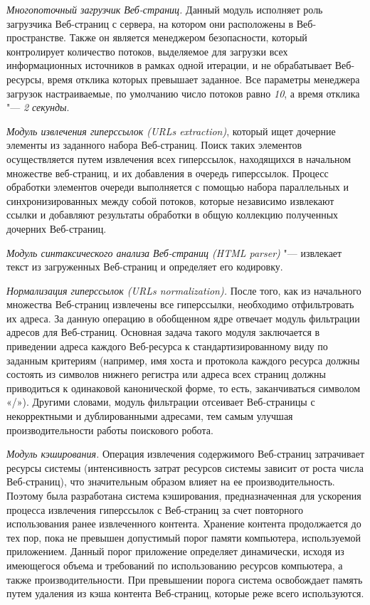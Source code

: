 \textit{Многопоточный загрузчик Веб-страниц.} Данный модуль исполняет роль загрузчика Веб-страниц с сервера, на котором они расположены в Веб-пространстве. Также он является менеджером безопасности, который контролирует количество потоков, выделяемое для загрузки всех информационных источников в рамках одной итерации, и не обрабатывает Веб-ресурсы, время отклика которых превышает заданное. Все параметры менеджера загрузок настраиваемые, по умолчанию число потоков равно \textit{10}, а время отклика "--- \textit{2 секунды}.

\textit{Модуль извлечения гиперссылок (URLs extraction)}, который ищет дочерние элементы из заданного набора Веб-страниц. Поиск таких элементов осуществляется путем извлечения всех гиперссылок, находящихся в начальном множестве веб-страниц, и их добавления в очередь гиперссылок. Процесс обработки элементов очереди выполняется с помощью набора параллельных и синхронизированных между собой потоков, которые независимо извлекают ссылки и добавляют результаты обработки в общую коллекцию полученных дочерних Веб-страниц.

\textit{Модуль синтаксического анализа Веб-страниц (HTML parser)} "--- извлекает текст из загруженных Веб-страниц и определяет его кодировку.

\textit{Нормализация гиперссылок (URLs normalization).} После того, как из начального множества Веб-страниц извлечены все гиперссылки, необходимо отфильтровать их адреса. За данную операцию в обобщенном ядре отвечает модуль фильтрации адресов для Веб-страниц. Основная задача такого модуля заключается в приведении адреса каждого Веб-ресурса к стандартизированному виду по заданным критериям \cite{LeeKimHong} (например, имя хоста и протокола каждого ресурса должны состоять из символов нижнего регистра или адреса всех страниц должны приводиться к одинаковой канонической форме, то есть, заканчиваться символом «/»). Другими словами, модуль фильтрации отсеивает Веб-страницы с некорректными и дублированными адресами, тем самым улучшая производительности работы поискового робота.

\textit{Модуль кэширования.} Операция извлечения содержимого Веб-страниц затрачивает ресурсы системы (интенсивность затрат ресурсов системы зависит от роста числа Веб-страниц), что значительным образом влияет на ее производительность. Поэтому была разработана система кэширования, предназначенная для ускорения процесса извлечения гиперссылок с Веб-страниц за счет повторного использования ранее извлеченного контента. Хранение контента продолжается до тех пор, пока не превышен допустимый порог памяти компьютера, используемой приложением. Данный порог приложение определяет динамически, исходя из имеющегося объема и требований по использованию ресурсов компьютера, а также производительности. При превышении порога система освобождает память путем удаления из кэша контента Веб-страниц, которые реже всего используются.


